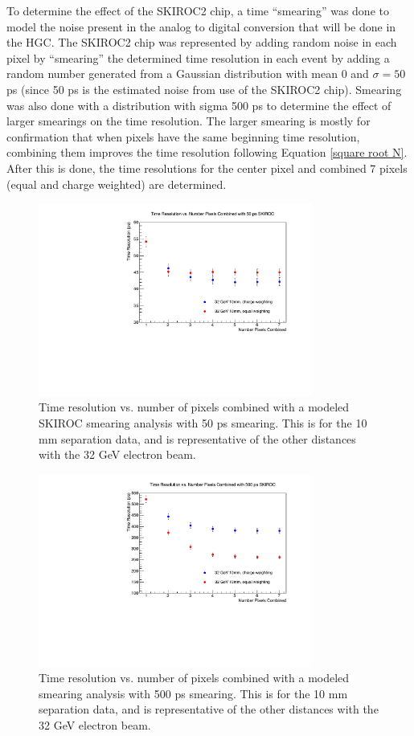 \documentclass[twocolumn,aps,prd,reprint]{revtex4-1}
\begin{document}
To determine the effect of the SKIROC2 chip, a time ``smearing'' was done to model the noise present in the analog to digital conversion that will be done in the HGC. The SKIROC2 chip was represented by adding random noise in each pixel by ``smearing'' the determined time resolution in each event by adding a random number generated from a Gaussian distribution with mean 0 and $\sigma= 50$ ps (since 50 ps is the estimated noise from use of the SKIROC2 chip). Smearing was also done with a distribution with sigma 500 ps to determine the effect of larger smearings on the time resolution. The larger smearing is mostly for confirmation that when pixels have the same beginning time resolution, combining them improves the time resolution following Equation \ref{square root N}. After this is done, the time resolutions for the center pixel and combined 7 pixels (equal and charge weighted) are determined.

\begin{figure}[!htbp]
\centering
\includegraphics[width = 0.8\textwidth]{smearing_50_10mm}
\caption{Time resolution vs. number of pixels combined with a modeled SKIROC smearing analysis with 50 ps smearing. This is for the 10 mm separation data, and is representative of the other distances with the 32 GeV electron beam.}
\label{50 smearing}
\end{figure}

\begin{figure}[!htbp]
\centering
\includegraphics[width = 0.8\textwidth]{smearing_500_10mm}
\caption{Time resolution vs. number of pixels combined with a modeled smearing analysis with 500 ps smearing. This is for the 10 mm separation data, and is representative of the other distances with the 32 GeV electron beam.}
\label{500 smearing}
\end{figure}
\end{document}
